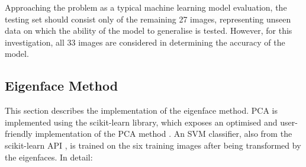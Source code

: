 Approaching the problem as a typical machine learning model evaluation, the testing set should consist only of the remaining 27 images, representing unseen data on which the ability of the model to generalise is tested. However, for this investigation, all 33 images are considered in determining the accuracy of the model.

\subsection{Eigenface Method}

This section describes the implementation of the eigenface method. PCA is implemented using the scikit-learn library, which exposes an optimised and user-friendly implementation of the PCA method \cite{sklearn_2023}. An SVM classifier, also from the scikit-learn API \cite{sklearn_2023b}, is trained on the six training images after being transformed by the eigenfaces. In detail:

